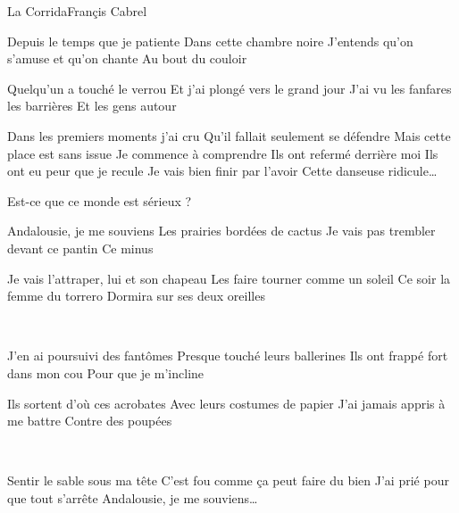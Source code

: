 \begin{Song}[Corrida]{La Corrida}{Françis Cabrel}
\begin{multicols}{2}

\begin{Verse}
Depuis le temps que je patiente
Dans cette chambre noire
J'entends qu'on s'amuse et qu'on chante
Au bout du couloir
\espaceInterStrophe

Quelqu'un a touché le verrou
Et j'ai plongé vers le grand jour
J'ai vu les fanfares les barrières
Et les gens autour
\end{Verse}
\espaceInterStrophe

\begin{Verse}
Dans les premiers moments j'ai cru
Qu'il fallait seulement se défendre
Mais cette place est sans issue
Je commence à comprendre
Ils ont refermé derrière moi
Ils ont eu peur que je recule
Je vais bien finir par l'avoir
Cette danseuse ridicule\dots
\end{Verse}
\espaceInterStrophe

\begin{Chorus}
Est-ce que ce monde est sérieux ? \bis
\end{Chorus}
\espaceInterStrophe

\begin{Verse}
Andalousie, je me souviens
Les prairies bordées de cactus
Je vais pas trembler devant ce pantin
Ce minus
\espaceInterStrophe

Je vais l'attraper, lui et son chapeau
Les faire tourner comme un soleil
Ce soir la femme du torrero
Dormira sur ses deux oreilles
\end{Verse}
\espaceInterStrophe

\aurefrain\\
\espaceInterStrophe

\begin{Bridge}
J'en ai poursuivi des fantômes
Presque touché leurs ballerines
Ils ont frappé fort dans mon cou
Pour que je m'incline
\espaceInterStrophe

Ils sortent d'où ces acrobates
Avec leurs costumes de papier
J'ai jamais appris à me battre
Contre des poupées
\end{Bridge}
\espaceInterStrophe

\aurefrain\\
\espaceInterStrophe

\begin{Verse}
Sentir le sable sous ma tête
C'est fou comme ça peut faire du bien
J'ai prié pour que tout s'arrête
Andalousie, je me souviens\dots
\espaceInterStrophe


\end{Verse}
\end{multicols}
\end{Song}
